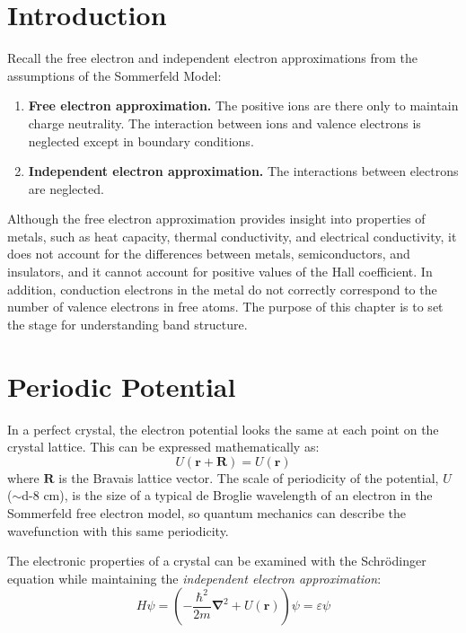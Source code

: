 \section{Introduction}
Recall the free electron and independent electron approximations from the assumptions of the Sommerfeld Model:

\begin{enumerate}
	\item \textbf{Free electron approximation.} The positive ions are there only to maintain charge neutrality. The interaction between ions and valence electrons is neglected except in boundary conditions.
	\item \textbf{Independent electron approximation.} The interactions between electrons are neglected.
\end{enumerate}


Although the free electron approximation provides insight into properties of metals, such as heat capacity, thermal conductivity, and electrical conductivity, it does not account for the differences between metals, semiconductors, and insulators, and it cannot account for positive values of the Hall coefficient. In addition, conduction electrons in the metal do not correctly correspond to the number of valence electrons in free atoms. The purpose of this chapter is to set the stage for understanding band structure.

\section{Periodic Potential}


In a perfect crystal, the electron potential looks the same at each point on the crystal lattice. This can be expressed mathematically as:
\begin{equation} \label{eq:U_period}
U(\boldsymbol{r} + \boldsymbol{R}) = U(\boldsymbol{r})
\end{equation}
where $\boldsymbol{R}$ is the Bravais lattice vector. The scale of periodicity of the potential, $U$ ($\sim$\num{d-8} cm), is the size of a typical de Broglie wavelength of an electron in the Sommerfeld free electron model, so quantum mechanics can describe the wavefunction with this same periodicity. 

The electronic properties of a crystal can be examined with the Schrödinger equation while maintaining the \textit{independent electron approximation}:
\begin{equation} \label{eq:schrod}
H\psi=\left(-\frac{\hbar^2}{2m}\boldsymbol{\nabla}^2 + U(\boldsymbol{r})\right)\psi = \varepsilon\psi
\end{equation}

